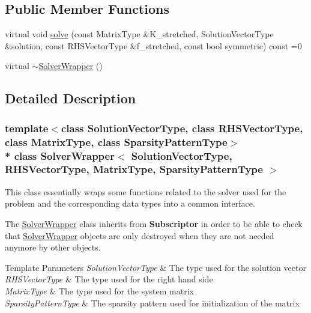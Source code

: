 \subsection*{Public Member Functions}
\begin{DoxyCompactItemize}
\item 
virtual void \hyperlink{class_solver_wrapper_a75a599630086e2edee14eb43ae071733}{solve} (const Matrix\+Type \&K\+\_\+stretched, Solution\+Vector\+Type \&solution, const R\+H\+S\+Vector\+Type \&f\+\_\+stretched, const bool symmetric) const =0
\item 
virtual \hyperlink{class_solver_wrapper_a738e65e298fb0b13327e853fc9683b6d}{$\sim$\+Solver\+Wrapper} ()
\end{DoxyCompactItemize}


\subsection{Detailed Description}
\subsubsection*{template$<$class Solution\+Vector\+Type, class R\+H\+S\+Vector\+Type, class Matrix\+Type, class Sparsity\+Pattern\+Type$>$\\*
class Solver\+Wrapper$<$ Solution\+Vector\+Type, R\+H\+S\+Vector\+Type, Matrix\+Type, Sparsity\+Pattern\+Type $>$}

This class essentially wraps some functions related to the solver used for the problem and the corresponding data types into a common interface.

The \hyperlink{class_solver_wrapper}{Solver\+Wrapper} class inherits from {\bf Subscriptor} in order to be able to check that \hyperlink{class_solver_wrapper}{Solver\+Wrapper} objects are only destroyed when they are not needed anymore by other objects.


\begin{DoxyTemplParams}{Template Parameters}
{\em Solution\+Vector\+Type} & The type used for the solution vector\\
\hline
{\em R\+H\+S\+Vector\+Type} & The type used for the right hand side\\
\hline
{\em Matrix\+Type} & The type used for the system matrix\\
\hline
{\em Sparsity\+Pattern\+Type} & The sparsity pattern used for initialization of the matrix \\
\hline
\end{DoxyTemplParams}


